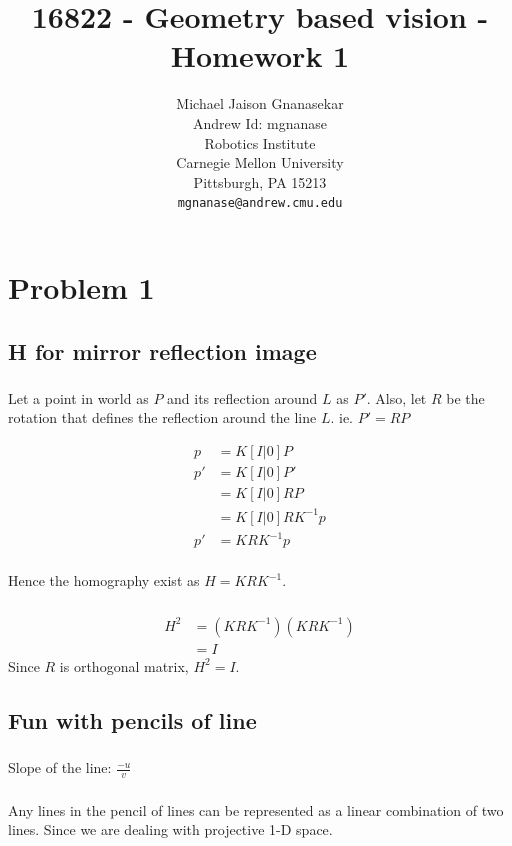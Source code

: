 \documentclass{article}
\title{16822 - Geometry based vision - Homework 1}
\author{
  Michael Jaison Gnanasekar\\
  Andrew Id: mgnanase\\
  Robotics Institute\\
  Carnegie Mellon University\\
  Pittsburgh, PA 15213 \\
  \texttt{mgnanase@andrew.cmu.edu} \\
 }
\begin{document}
\maketitle

\section{Problem 1}

\subsection{H for mirror reflection image}

\subsubsection{}
Let a point in world as $P$ and its reflection around $L$ as $P'$. Also, let $R$ be the rotation that defines the reflection around the line $L$. ie. $P' = RP$

\begin{align*}
p &= K [ I | 0 ] P \\
p' &= K [ I | 0 ] P' \\
&= K [ I | 0 ] RP \\
&= K [ I | 0 ] R K^{-1} p \\
p' &= K R K^{-1} p \\
\end{align*}

Hence the homography exist as $H = K R K^{-1}$.

\subsubsection{}
\begin{align*}
H^2 &= (K R K^{-1}) (K R K^{-1}) \\
&= I
\end{align*}
Since $R$ is orthogonal matrix, $H^2 = I$.


\subsection{Fun with pencils of line}

\subsubsection{}
Slope of the line: $\frac{-u}{v}$

\subsubsection{}
Any lines in the pencil of lines can be represented as a linear combination of two lines. Since we are dealing with projective 1-D space.
\end{document}
